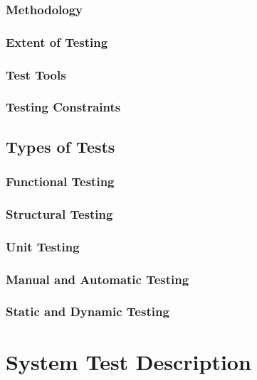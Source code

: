 \documentclass[12pt]{article}
\begin{document}
\subsubsection{Methodology} 

\subsubsection{Extent of Testing}

\subsubsection{Test Tools}


\subsubsection{ Testing Constraints}

\subsection{Types of Tests}

\subsubsection{Functional Testing}

\subsubsection{Structural Testing}

\subsubsection{Unit Testing}

\subsubsection{Manual and Automatic Testing}

\subsubsection{Static and Dynamic Testing}

%
%

\section{System Test Description}
\end{document}
